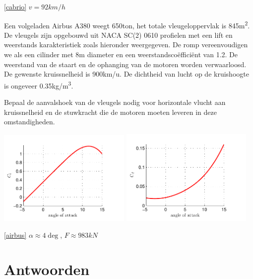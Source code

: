 \begin{antwoord}{\ref{cabrio}}
	$v=92\unit{km/h}$
\end{antwoord}
\begin{toepassing}[*]
	\label{airbus}
Een volgeladen Airbus A380 weegt 650ton, het totale vleugeloppervlak is 845\unit{m^2}. De vleugels zijn opgebouwd uit NACA SC(2) 0610 profielen met een lift en weerstands karakteristiek zoals hieronder weergegeven. De romp vereenvoudigen we als een cilinder met 8m diameter en een weerstandscoëfficiënt van 1.2. De weerstand van de staart en de ophanging van de motoren worden verwaarloosd. De gewenste kruissnelheid is 900km/u. De dichtheid van lucht op de kruishoogte is ongeveer 0.35\unit{kg/m^3}.
		
Bepaal de aanvalshoek van de vleugels nodig voor horizontale vlucht aan kruissnelheid en de stuwkracht die de motoren moeten leveren in deze omstandigheden.

	\centering
	\includegraphics[width=0.48\textwidth]{fig/uitwendige_stroming/NACA_SC(2)_0610_Cl.pdf}
	\includegraphics[width=0.48\textwidth]{fig/uitwendige_stroming/NACA_SC(2)_0610_Cd.pdf}
\end{toepassing}
\begin{antwoord}{\ref{airbus}}
	$\alpha \approx 4\deg$, $F \approx 983\unit{kN}$
\end{antwoord}


\section*{Antwoorden}
	\begin{multicols}{2}
	\end{multicols}